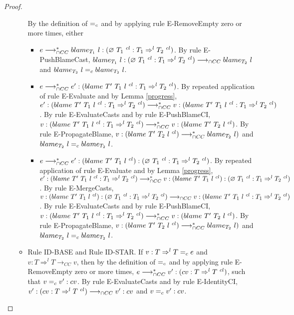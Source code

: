 \documentclass[a4paper]{article}
\begin{document}
\begin{proof}
\begin{itemize}
\begin{itemize}
        By the definition of $=_c$ and by applying rule E-RemoveEmpty zero or more times, either
        \begin{itemize}
            \item $e \longrightarrow_{\cap CC}^* blame_{T_1}\ l : (\varnothing\ T_1\ ^{cl} : T_1 \Rightarrow^l T_2\ ^{cl})$.
            By rule E-PushBlameCast, $blame_{T_1}\ l : (\varnothing\ T_1\ ^{cl} : T_1 \Rightarrow^l T_2\ ^{cl}) \longrightarrow_{\cap CC} blame_{T_2}\ l$ and $blame_{T_2}\ l =_c blame_{T_2}\ l$.
            \item $e \longrightarrow_{\cap CC}^* e' : (blame\ T'\ T_1\ l\ ^{cl} : T_1 \Rightarrow^l T_2\ ^{cl})$.
            By repeated application of rule E-Evaluate and by Lemma \ref{progress}, $e' : (blame\ T'\ T_1\ l\ ^{cl} : T_1 \Rightarrow^l T_2\ ^{cl}) \longrightarrow_{\cap CC}^* v : (blame\ T'\ T_1\ l\ ^{cl} : T_1 \Rightarrow^l T_2\ ^{cl})$.
            By rule E-EvaluateCasts and by rule E-PushBlameCI, $v : (blame\ T'\ T_1\ l\ ^{cl} : T_1 \Rightarrow^l T_2\ ^{cl}) \longrightarrow_{\cap CC}^* v : (blame\ T'\ T_2\ l\ ^{cl})$.
            By rule E-PropagateBlame, $v : (blame\ T'\ T_2\ l\ ^{cl}) \longrightarrow_{\cap CC}^* blame_{T_2}\ l)$ and $blame_{T_2}\ l =_c blame_{T_2}\ l$.
            \item $e \longrightarrow_{\cap CC}^* e' : (blame\ T'\ T_1\ l\ ^{cl}) : (\varnothing\ T_1\ ^{cl} : T_1 \Rightarrow^l T_2\ ^{cl})$.
            By repeated application of rule E-Evaluate and by Lemma \ref{progress}, $e' : (blame\ T'\ T_1\ l\ ^{cl} : T_1 \Rightarrow^l T_2\ ^{cl}) \longrightarrow_{\cap CC}^* v : (blame\ T'\ T_1\ l\ ^{cl}) : (\varnothing\ T_1\ ^{cl} : T_1 \Rightarrow^l T_2\ ^{cl})$.
            By rule E-MergeCasts, $v : (blame\ T'\ T_1\ l\ ^{cl}) : (\varnothing\ T_1\ ^{cl} : T_1 \Rightarrow^l T_2\ ^{cl}) \longrightarrow_{\cap CC} v : (blame\ T'\ T_1\ l\ ^{cl} : T_1 \Rightarrow^l T_2\ ^{cl})$.
            By rule E-EvaluateCasts and by rule E-PushBlameCI, $v : (blame\ T'\ T_1\ l\ ^{cl} : T_1 \Rightarrow^l T_2\ ^{cl}) \longrightarrow_{\cap CC}^* v : (blame\ T'\ T_2\ l\ ^{cl})$.
            By rule E-PropagateBlame, $v : (blame\ T'\ T_2\ l\ ^{cl}) \longrightarrow_{\cap CC}^* blame_{T_2}\ l)$ and $blame_{T_2}\ l =_c blame_{T_2}\ l$.
        \end{itemize}
        \item Rule ID-BASE and Rule ID-STAR.
        If $v : T \Rightarrow^l T =_c e$ and $v : T \Rightarrow^l T \longrightarrow_{CC} v$, then by the definition of $=_c$ and by applying rule E-RemoveEmpty zero or more times, $e \longrightarrow_{\cap CC}^* v' : (cv : T \Rightarrow^l T\ ^{cl})$, such that $v =_c v' : cv$.
        By rule E-EvaluateCasts and by rule E-IdentityCI, $v' : (cv : T \Rightarrow^l T\ ^{cl}) \longrightarrow_{\cap CC} v' : cv$ and $v =_c v' : cv$.

\end{itemize}
\end{itemize}
\end{proof}
\end{document}
